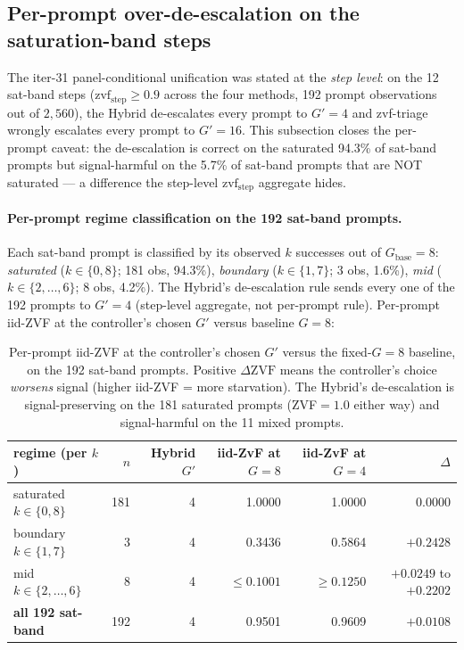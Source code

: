 \subsection{Per-prompt over-de-escalation on the saturation-band steps}
\label{sec:p7-satband-perprompt}

The iter-31 panel-conditional unification was stated at the
\emph{step level}: on the 12 sat-band steps
($\mathrm{zvf}_\text{step} \ge 0.9$ across the four methods,
192 prompt observations out of $2{,}560$), the Hybrid de-escalates
every prompt to $G'=4$ and zvf-triage wrongly escalates every prompt
to $G'=16$. This subsection closes the per-prompt caveat: the
de-escalation is correct on the saturated 94.3\% of sat-band prompts
but signal-harmful on the 5.7\% of sat-band prompts that are NOT
saturated --- a difference the step-level $\mathrm{zvf}_\text{step}$
aggregate hides.

\paragraph{Per-prompt regime classification on the 192 sat-band
prompts.}
Each sat-band prompt is classified by its observed $k$ successes out of
$G_\text{base}{=}8$: \emph{saturated} ($k \in \{0, 8\}$; 181 obs,
94.3\%), \emph{boundary} ($k \in \{1, 7\}$; 3 obs, 1.6\%),
\emph{mid} ($k \in \{2, \dots, 6\}$; 8 obs, 4.2\%). The Hybrid's
de-escalation rule sends every one of the 192 prompts to $G'=4$
(step-level aggregate, not per-prompt rule). Per-prompt iid-ZVF at
the controller's chosen $G'$ versus baseline $G{=}8$:

\begin{table}[t]
\centering
\caption{Per-prompt iid-ZVF at the controller's chosen $G'$
versus the fixed-$G{=}8$ baseline, on the 192 sat-band prompts.
Positive $\Delta\mathrm{ZVF}$ means the controller's choice \emph{worsens}
signal (higher iid-ZVF = more starvation). The Hybrid's de-escalation
is signal-preserving on the 181 saturated prompts (ZVF$=1.0$ either
way) and signal-harmful on the 11 mixed prompts.}
\label{tab:p7-satband-perprompt}
\begin{tabular}{lrrrrr}
\toprule
regime (per $k$) & $n$ & Hybrid $G'$ & iid-ZvF at $G{=}8$ & iid-ZvF at $G{=}4$ & $\Delta$ \\
\midrule
saturated $k{\in}\{0,8\}$ & 181 & 4 & 1.0000 & 1.0000 & 0.0000 \\
boundary $k{\in}\{1,7\}$  &   3 & 4 & 0.3436 & 0.5864 & $+0.2428$ \\
mid $k{\in}\{2,\ldots,6\}$ & 8 & 4 & $\le 0.1001$ & $\ge 0.1250$ & $+0.0249$ to $+0.2202$ \\
\midrule
\textbf{all 192 sat-band} & 192 & 4 & 0.9501 & 0.9609 & $+0.0108$ \\
\bottomrule
\end{tabular}
\end{table}

